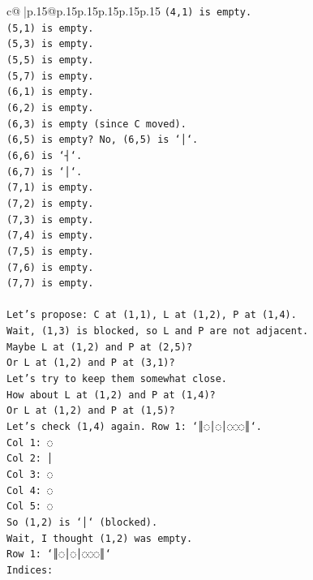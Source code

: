 \documentclass{article}
\begin{document}
{\begin{supertabular}{c@{$\;$}|p{.15\linewidth}@{}p{.15\linewidth}p{.15\linewidth}p{.15\linewidth}p{.15\linewidth}p{.15\linewidth}}
{{{\texttt{(4,1) is empty.} \\
\texttt{(5,1) is empty.} \\
\texttt{(5,3) is empty.} \\
\texttt{(5,5) is empty.} \\
\texttt{(5,7) is empty.} \\
\texttt{(6,1) is empty.} \\
\texttt{(6,2) is empty.} \\
\texttt{(6,3) is empty (since C moved).} \\
\texttt{(6,5) is empty? No, (6,5) is `│`.} \\
\texttt{(6,6) is `┤`.} \\
\texttt{(6,7) is `│`.} \\
\texttt{(7,1) is empty.} \\
\texttt{(7,2) is empty.} \\
\texttt{(7,3) is empty.} \\
\texttt{(7,4) is empty.} \\
\texttt{(7,5) is empty.} \\
\texttt{(7,6) is empty.} \\
\texttt{(7,7) is empty.} \\
\\ 
\texttt{Let's propose: C at (1,1), L at (1,2), P at (1,4).} \\
\texttt{Wait, (1,3) is blocked, so L and P are not adjacent.} \\
\texttt{Maybe L at (1,2) and P at (2,5)?} \\
\texttt{Or L at (1,2) and P at (3,1)?} \\
\texttt{Let's try to keep them somewhat close.} \\
\texttt{How about L at (1,2) and P at (1,4)?} \\
\texttt{Or L at (1,2) and P at (1,5)?} \\
\texttt{Let's check (1,4) again. Row 1: `║◌│◌│◌◌◌║`.} \\
\texttt{Col 1: ◌} \\
\texttt{Col 2: │} \\
\texttt{Col 3: ◌} \\
\texttt{Col 4: ◌} \\
\texttt{Col 5: ◌} \\
\texttt{So (1,2) is `│` (blocked).} \\
\texttt{Wait, I thought (1,2) was empty.} \\
\texttt{Row 1: `║◌│◌│◌◌◌║`} \\
\texttt{Indices:} \\
}}}
\end{supertabular}}
\end{document}
